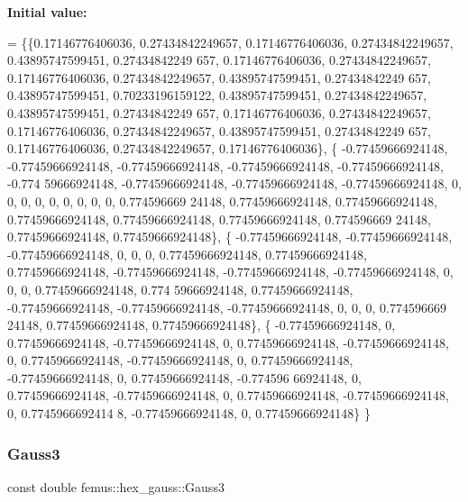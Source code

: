{\bfseries Initial value\+:}
\begin{DoxyCode}
= \{\{0.17146776406036, 0.27434842249657, 0.17146776406036, 0.27434842249657, 0.43895747599451, 0.27434842249
      657, 0.17146776406036, 0.27434842249657, 0.17146776406036, 0.27434842249657, 0.43895747599451, 0.27434842249
      657, 0.43895747599451, 0.70233196159122, 0.43895747599451, 0.27434842249657, 0.43895747599451, 0.27434842249
      657, 0.17146776406036, 0.27434842249657, 0.17146776406036, 0.27434842249657, 0.43895747599451, 0.27434842249
      657, 0.17146776406036, 0.27434842249657, 0.17146776406036\},
    \{ -0.77459666924148, -0.77459666924148, -0.77459666924148, -0.77459666924148, -0.77459666924148, -0.774
      59666924148, -0.77459666924148, -0.77459666924148, -0.77459666924148, 0, 0, 0, 0, 0, 0, 0, 0, 0, 0.774596669
      24148, 0.77459666924148, 0.77459666924148, 0.77459666924148, 0.77459666924148, 0.77459666924148, 0.774596669
      24148, 0.77459666924148, 0.77459666924148\},
    \{ -0.77459666924148, -0.77459666924148, -0.77459666924148, 0, 0, 0, 0.77459666924148, 0.77459666924148,
       0.77459666924148, -0.77459666924148, -0.77459666924148, -0.77459666924148, 0, 0, 0, 0.77459666924148, 0.774
      59666924148, 0.77459666924148, -0.77459666924148, -0.77459666924148, -0.77459666924148, 0, 0, 0, 0.774596669
      24148, 0.77459666924148, 0.77459666924148\},
    \{ -0.77459666924148, 0, 0.77459666924148, -0.77459666924148, 0, 0.77459666924148, -0.77459666924148, 0,
       0.77459666924148, -0.77459666924148, 0, 0.77459666924148, -0.77459666924148, 0, 0.77459666924148, -0.774596
      66924148, 0, 0.77459666924148, -0.77459666924148, 0, 0.77459666924148, -0.77459666924148, 0, 0.7745966692414
      8, -0.77459666924148, 0, 0.77459666924148\}
  \}
\end{DoxyCode}
\mbox{\label{classfemus_1_1hex__gauss_a7b371e3076b486fc863ebf418cc75fec}} 
\subsubsection{\texorpdfstring{Gauss3}{Gauss3}}
{\footnotesize\ttfamily const double femus\+::hex\+\_\+gauss\+::\+Gauss3\hspace{0.3cm}{\ttfamily [static]}}

